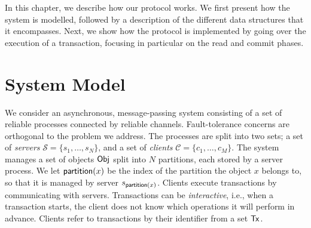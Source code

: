 \newcommand{\parti}{\mathit{p_i}}
\newcommand{\partj}{\mathit{s_j}}

\newcommand{\transtype}{{\sf Tx}}
\newcommand{\keytype}{{\sf Object}}
\newcommand{\valuetype}{{\sf Value}}
\newcommand{\vctype}{{\sf VerVector}}

\newcommand{\val}{{\sf val}}

\newcommand{\tx}{\ensuremath{\mathit{T}}}

\newcommand{\commitVC}{\mathit{Vcomm}}

\newcommand{\localkey}{{\sf k}}
\newcommand{\localval}{{\sf v}}
\newcommand{\partitionof}{{\sf partition}}

\newcommand{\SubAlgo}[2]{#1 \SubAlgoBlock{#2}}





In this chapter, we describe how our protocol works. We first present how the system is modelled, followed by a description of the different data structures that it encompasses. Next, we show how the protocol is implemented by going over the execution of a transaction, focusing in particular on the read and commit phases.

\section{System Model}

We consider an asynchronous, message-passing system consisting of a set of reliable processes connected by reliable channels. Fault-tolerance concerns are orthogonal to the problem we address. The processes are split into two sets; a set of \emph{servers} $\mathcal{S} = \{s_1, \dots, s_N\}$, and a set of \emph{clients} $\mathcal{C} = \{c_1, \dots, c_M\}$. The system manages a set of objects ${\sf Obj}$ split into $N$ partitions, each stored by a server process. We let $\mathsf{partition}(x)$ be the index of the partition the object $x$ belongs to, so that it is managed by server $s_{\mathsf{partition}(x)}$. Clients execute transactions by communicating with servers. Transactions can be \emph{interactive}, i.e., when a transaction starts, the client does not know which operations it will perform in advance. Clients refer to transactions by their identifier from a set $\transtype$.

